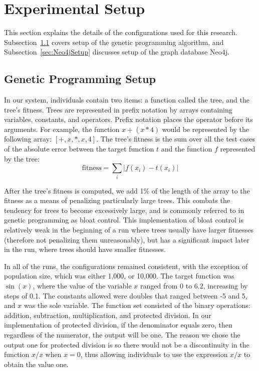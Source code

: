 \documentclass[12pt]{article}
\begin{document}
\section{Experimental Setup} 
\label{sec:experiments}

This section explains the details of the configurations used for this research. Subsection~\ref{sec:GPSetup} covers setup of the genetic programming algorithm, and Subsection~\ref{sec:Neo4jSetup} discusses setup of the graph database Neo4j.

\subsection{Genetic Programming Setup}
\label{sec:GPSetup}

In our system, individuals contain two items: a function called the tree, and the tree's fitness. Trees are represented in prefix notation by arrays containing variables, constants, and operators. Prefix notation places the operator before its arguments. For example, the function $x + (x * 4)$ would be represented by the following array: $[+, x, *, x, 4]$. The tree's fitness is the sum over all the test cases of the absolute error between the target function $t$ and the function $f$ represented by the tree:
\[
	\textrm{fitness} = \sum_i |f(x_i)- t(x_i)|
\]

After the tree's fitness is computed, we add 1\% of the length of the array to the fitness as a means of penalizing particularly large trees. This combats the tendency for trees to become excessively large, and is commonly referred to in genetic programming as bloat control. This implementation of bloat control is relatively weak in the beginning of a run where trees usually have larger fitnesses (therefore not penalizing them unreasonably), but has a significant impact later in the run, where trees should have smaller fitnesses.

In all of the runs, the configurations remained consistent, with the exception of population size, which was either 1,000, or 10,000. The target function was $\sin(x)$,
where the value of the variable $x$ ranged from 0 to 6.2, increasing by steps of 0.1. The constants allowed were doubles that ranged between -5 and 5, and $x$ was the sole variable. The function set consisted of the binary operations: addition, subtraction, multiplication, and protected division. In our implementation of protected division, if the denominator equals zero, then regardless of the numerator, the output will be one. The reason we chose the output one for protected division is so there would not be a discontinuity in the function $x/x$ when $x = 0$, thus allowing individuals to use the expression $x/x$ to obtain the value one.
\end{document}
